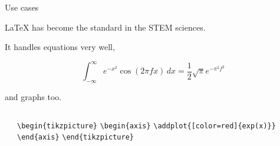 \documentclass{beamer}
\newcommand{\command}[2]{\texttt{\textbackslash#1\{#2\}}}
\begin{document}
\begin{frame}{Use cases}

    \LaTeX{} has become the standard in the STEM sciences.

    \medskip

    It handles equations very well,

    \medskip
    {\rmfamily
        \begin{equation}
            \int_{-\infty}^{\infty} e^{-x^2} \cos(2\pi f x) \, dx = \frac{1}{2} \sqrt{\pi} e^{-\pi^2 f^2}
        \end{equation}
    }

    \medskip

    and graphs too.

    \medskip

    \begin{columns}
        \begin{column}{0.5\textwidth}
        \end{column}
        \begin{column}{0.5\textwidth}
            \ttfamily\small
            \command{begin}{tikzpicture}
            \quad\command{begin}{axis}
            \quad\quad\command{addplot}{[color=red]\{exp(x)\}}
            \quad\command{end}{axis}
            \command{end}{tikzpicture}
        \end{column}
    \end{columns}
\end{frame}
\end{document}
